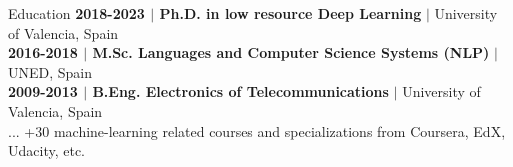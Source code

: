 \documentclass{resume} %
\begin{document}
\vspace{5pt}
\begin{rSection}{Education}
{\textbf{2018-2023 $|$ Ph.D. in low resource Deep Learning}  $|$  University of Valencia, Spain}
\\
{\textbf{2016-2018 $|$ M.Sc. Languages and Computer Science Systems (NLP)}  $|$  UNED, Spain}
\\
{\textbf{2009-2013 $|$ B.Eng. Electronics of Telecommunications}  $|$ University of Valencia, Spain}\\
{... +30 machine-learning related  courses and specializations from Coursera, EdX, Udacity, etc.}
\end{rSection}




\vspace{5pt}
\end{document}

